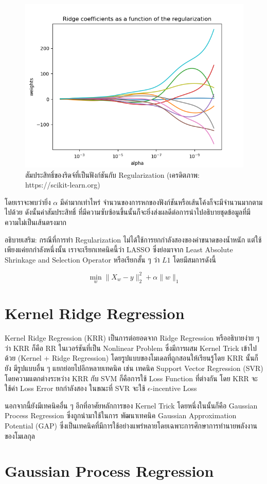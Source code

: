 \begin{figure}[H]
    \centering
    \includegraphics[width=0.8\linewidth]{fig/plot_ridge_regression.png}
    \caption{สัมประสิทธิ์ของริดจ์ที่เป็นฟังก์ชันกับ Regularization (เครดิตภาพ: https://scikit-learn.org)}
    \label{fig:ridge_res}
\end{figure}

\noindent โดยเราจะพบว่ายิ่ง $\alpha$ มีค่ามากเท่าไหร่ จำนวนของการหกของฟังก์ชันหรือเส้นโค้งก็จะมีจำนวนมากตามไปด้วย ดังนั้นค่าสัมประสิทธิ์
ที่มีความซับซ้อนขึ้นนั้นก็จะยิ่งส่งผลดีต่อการนำไปอธิบายชุดข้อมูลที่มีความไม่เป็นเส้นตรงมาก

อธิบายเสริม: กรณีที่การทำ Regularization ไม่ได้ใช้การยกกำลังสองของค่าขนาดของน้ำหนัก แต่ใช้เพียงแค่ยกกำลังหนึ่งนั้น เราจะเรียกเทคนิคนี้ว่า
LASSO ซึ่งย่อมาจาก Least Absolute Shrinkage and Selection Operator หรือเรียกสั้น ๆ ว่า $L1$ โดยมีสมการดังนี้

\begin{equation}
    \min_{w} \lVert X_{w} - y \rVert_{2}^{2} + \alpha \lVert w \rVert_{1}
\end{equation}

\section{Kernel Ridge Regression}

Kernel Ridge Regression (KRR) เป็นการต่อยอดจาก Ridge Regression หรืออธิบายง่าย ๆ ว่า KRR ก็คือ RR ในเวอร์ชันที่เป็น Nonlinear 
Problem ซึ่งมีการผสม Kernel Trick เข้าไปด้วย (Kernel + Ridge Regression) โดยรูปแบบของโมเดลที่ถูกสอนให้เรียนรู้โดย KRR นั้นก็ยัง%
มีรูปแบบอื่น ๆ แยกย่อยไปอีกหลายเทคนิค เช่น เทคนิค Support Vector Regression (SVR) โดยความแตกต่างระหว่าง KRR กับ SVM ก็คือการใช้
Loss Function ที่ต่างกัน โดย KRR จะใช้ค่า Loss Error ยกกำลังสอง ในขณะที่ SVR จะใช้ $\epsilon$-incentive Loss

นอกจากนี้ยังมีเทคนิคอื่น ๆ อีกที่อาศัยหลักการของ Kernel Trick โดยหนึ่งในนั้นก็คือ Gaussian Process Regression ซึ่งถูกนำมาใช้ในการ%
พัฒนาเทคนิค Gaussian Approximation Potential (GAP) ซึ่งเป็นเทคนิคที่มีการใช้อย่างแพร่หลายโดยเฉพาะการศึกษาการทำนายพลังงาน%
ของโมเลกุล

\section{Gaussian Process Regression}
